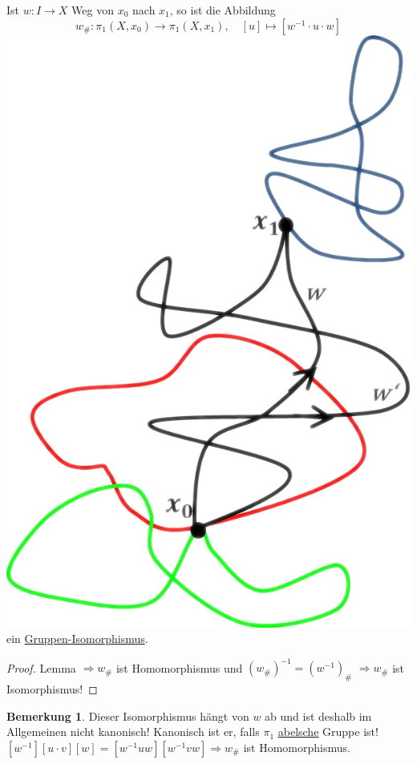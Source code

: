 \documentclass[a4paper,11pt,notitlepage]{report}
\theoremstyle{definition}
\newtheorem{remark}{Bemerkung}[chapter]
\begin{document}
\begin{theorem}
	Ist $w \colon I \rightarrow X$ Weg von $x_0$ nach $x_1$, so ist die Abbildung 
	$$w_\# \colon \pi_1(X,x_0) \rightarrow \pi_1(X,x_1), \quad [u] \mapsto [w^{-1} \cdot u \cdot w]$$ \includegraphics[scale=0.4]{images/Basispunkt_Unabhaengigkeit.png}
	ein \underline{Gruppen-Isomorphismus}.
\end{theorem}

\begin{proof}
	Lemma $\Rightarrow w_\#$ ist Homomorphismus und $(w_\#)^{-1} = (w^{-1})_\#$ \newline $\Rightarrow w_\#$ ist Isomorphismus!
\end{proof}

\begin{remark}
	Dieser Isomorphismus hängt von $w$ ab und ist deshalb im Allgemeinen nicht kanonisch!
	Kanonisch ist er, falls $\pi_1$ \underline{\underline{abelsche}} Gruppe ist!
	\newline
$[w^{-1}][u \cdot v][w] = [w^{-1} u w] [w^{-1} v w] \Rightarrow w_\#$ ist Homomorphismus.

\end{remark}
\end{document}
